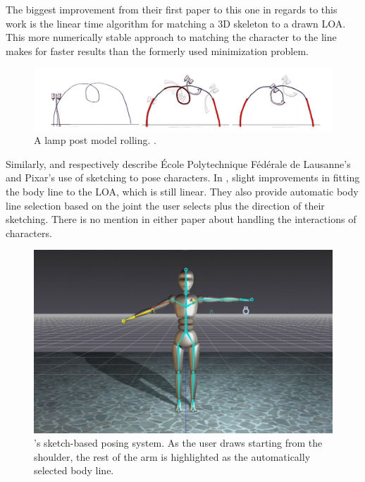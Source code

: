 The biggest improvement from their first paper to this one in regards to this work is the linear time algorithm for matching a 3D skeleton to a drawn LOA. This more numerically stable approach to matching the character to the line makes for faster results than the formerly used minimization problem.

\begin{figure}[!h]
\includegraphics[scale=0.4]{img/rolling}
\caption{A lamp post model rolling. \citep{guay2015space}.}
\end{figure}

Similarly, \citep{mahmudi2016artist} and \citep{stelzleni2015sketch} respectively describe \'Ecole Polytechnique F\'ed\'erale de Lausanne's and Pixar's use of sketching to pose characters. In \citep{mahmudi2016artist}, slight improvements in fitting the body line to the LOA, which is still linear. They also provide automatic body line selection based on the joint the user selects plus the direction of their sketching. There is no mention in either paper about handling the interactions of characters. 

\begin{figure}[!h]
\centering
\includegraphics[scale=0.3]{img/epfl}
\caption{ \citep{mahmudi2016artist}'s sketch-based posing system. As the user draws starting from the shoulder, the rest of the arm is highlighted as the automatically selected body line.}
\end{figure}

